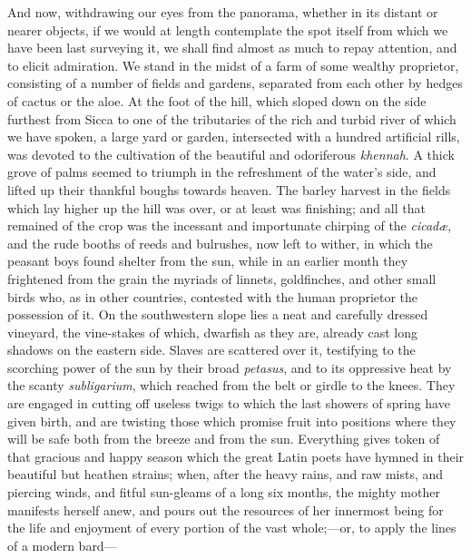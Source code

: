 And now, withdrawing our eyes from the panorama, whether in its
distant or nearer objects, if we would at length contemplate the spot
itself from which we have been last surveying it, we shall find almost
as much to repay attention, and to elicit admiration. We stand in the
midst of a farm of some wealthy proprietor, consisting of a number of
fields and gardens, separated from each other by hedges of cactus or
the aloe. At the foot of the hill, which sloped down on the side
furthest from Sicca to one of the tributaries of the rich and turbid
river of which we have spoken, a large yard or garden, intersected
with a hundred artificial rills, was devoted to the cultivation of the
beautiful and odoriferous \emph{khennah}. A thick grove of palms
seemed to triumph in the refreshment of the water's side, and lifted
up their thankful boughs towards heaven. The barley harvest in the
fields which lay higher up the hill was over, or at least was
finishing; and all that remained of the crop was the incessant and
importunate chirping of the \emph{cicadæ}, and the rude booths of
reeds and bulrushes, now left to wither, in which the peasant boys
found shelter from the sun, while in an earlier month they frightened
from the grain the myriads of linnets, goldfinches, and other
small birds who, as in other countries, contested with the human
proprietor the possession of it. On the southwestern slope lies a neat
and carefully dressed vineyard, the vine-stakes of which, dwarfish as
they are, already cast long shadows on the eastern side. Slaves are
scattered over it, testifying to the scorching power of the sun by
their broad \emph{petasus}, and to its oppressive heat by the scanty \emph{subligarium},
which reached from the belt or girdle to the knees. They are engaged
in cutting off useless twigs to which the last showers of spring have
given birth, and are twisting those which promise fruit into positions
where they will be safe both from the breeze and from the sun.
Everything gives token of that gracious and happy season which the
great Latin poets have hymned in their beautiful but heathen strains;
when, after the heavy rains, and raw mists, and piercing winds, and
fitful sun-gleams of a long six months, the mighty mother manifests
herself anew, and pours out the resources of her innermost being for
the life and enjoyment of every portion of the vast whole;—or, to
apply the lines of a modern bard—

